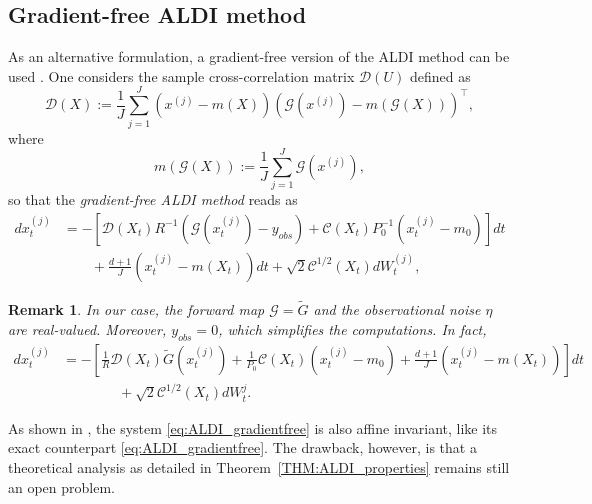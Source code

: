 \documentclass[a4paper]{article}
\numberwithin{equation}{section}
\newtheorem{remark}[theorem]{Remark}
\begin{document}
\subsection{Gradient-free ALDI method}
As an alternative formulation, a gradient-free version of the ALDI method can be used \cite{Nusken20}. One considers the sample cross-correlation matrix $\mathcal{D}(U)$ defined as
\begin{equation}
    \label{eq:crosscorrelation_matrix}
\mathcal{D}(X):= \frac{1}{J}\sum_{j=1}^J \left(x^{(j)}-m(X)\right) \left( \mathcal{G}(x^{(j)})-m(\mathcal{G}(X)) \right)^\top,
\end{equation}
where
\begin{equation}
    \label{eq:sample_mean2}
m(\mathcal{G}(X)):= \frac{1}{J}\sum_{j=1}^J \mathcal{G}\left(x^{(j)} \right),
\end{equation}
so that the \textit{gradient-free ALDI method} reads as
\begin{equation}
    \label{eq:ALDI_gradientfree}
\begin{split}
    dx^{(j)}_t & = -\left[ \mathcal{D}(X_t) R^{-1}\left( \mathcal{G}\left( x_t^{(j)} \right) -y_{obs}\right) +\mathcal{C}(X_t)P_0^{-1}\left(  x_t^{(j)}-m_0\right) \right]dt \\
    & \qquad + \frac{d+1}{J}\left(  x_t^{(j)}-m(X_t)\right)dt + \sqrt{2} \mathcal{C}^{1/2}(X_t)dW^{(j)}_t,
\end{split}
\end{equation}

\begin{remark}
    In our case, the forward map $\mathcal{G}=\tilde{G}$ and the observational noise $\eta$ are real-valued. Moreover, $y_{obs}=0$, which simplifies the computations. In fact,
\begin{equation}        \label{eq:ALDI_gradientfree_particular}
\begin{split}
dx_t^{(j)} & = -\left[ \frac{1}{R}\mathcal{D}(X_t)\tilde{G}\left(x_t^{(j)}\right) + \frac{1}{P_0}\mathcal{C}(X_t)\left( x_t^{(j)}-m_0\right) + \frac{d+1}{J}\left( x_t^{(j)}-m(X_t) \right)\right] dt \\
 & \qquad \qquad +\sqrt{2} \mathcal{C}^{1/2}(X_t)dW_t^{j}.
\end{split}
\end{equation}
\end{remark}

As shown in \cite{Nusken20}, the system \eqref{eq:ALDI_gradientfree} is also affine invariant, like its exact counterpart \eqref{eq:ALDI_gradientfree}. The drawback, however, is that a theoretical analysis as detailed in Theorem~\ref{THM:ALDI_properties} remains still an open problem.
\end{document}
